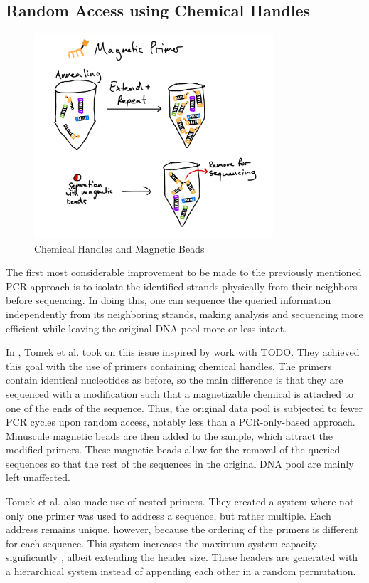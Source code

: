 \documentclass[a4paper,conference]{IEEEtran}
\begin{document}
\subsection{Random Access using Chemical Handles}

\begin{figure}[!t]
\centering
\includegraphics[width=3.5in]{chemicalHandlesRA}
\caption{Chemical Handles and Magnetic Beads}
\label{pcr_challenges}
\end{figure}

The first most considerable improvement to be made to the previously mentioned PCR approach is to isolate the identified strands physically from their neighbors before sequencing. In doing this, one can sequence the queried information independently from its neighboring strands, making analysis and sequencing more efficient while leaving the original DNA pool more or less intact.

In \cite{chemicalhandles}, Tomek et al. took on this issue inspired by \cite{chemicalhandles} work with TODO. They achieved this goal with the use of primers containing chemical handles. The primers contain identical nucleotides as before, so the main difference is that they are sequenced with a modification such that a magnetizable chemical is attached to one of the ends of the sequence. Thus, the original data pool is subjected to fewer PCR cycles upon random access, notably less than a PCR-only-based approach. Minuscule magnetic beads are then added to the sample, which attract the modified primers. These magnetic beads allow for the removal of the queried sequences so that the rest of the sequences in the original DNA pool are mainly left unaffected.

Tomek et al. also made use of nested primers. They created a system where not only one primer was used to address a sequence, but rather multiple. Each address remains unique, however, because the ordering of the primers is different for each sequence. This system increases the maximum system capacity significantly \cite{chemicalhandles}, albeit extending the header size. These headers are generated with a hierarchical system instead of appending each other in a random permutation.
\end{document}
